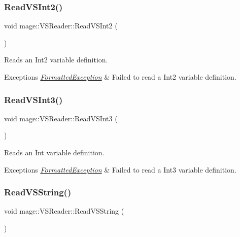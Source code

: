 \subsubsection{\texorpdfstring{Read\+V\+S\+Int2()}{ReadVSInt2()}}
{\footnotesize\ttfamily void mage\+::\+V\+S\+Reader\+::\+Read\+V\+S\+Int2 (\begin{DoxyParamCaption}{ }\end{DoxyParamCaption})\hspace{0.3cm}{\ttfamily [private]}}

Reads an Int2 variable definition.


\begin{DoxyExceptions}{Exceptions}
{\em \hyperlink{structmage_1_1_formatted_exception}{Formatted\+Exception}} & Failed to read a Int2 variable definition. \\
\hline
\end{DoxyExceptions}
\hypertarget{classmage_1_1_v_s_reader_a6fa8fa2cbb66a9a1872bb84a0612a32d}{}\label{classmage_1_1_v_s_reader_a6fa8fa2cbb66a9a1872bb84a0612a32d} 
\subsubsection{\texorpdfstring{Read\+V\+S\+Int3()}{ReadVSInt3()}}
{\footnotesize\ttfamily void mage\+::\+V\+S\+Reader\+::\+Read\+V\+S\+Int3 (\begin{DoxyParamCaption}{ }\end{DoxyParamCaption})\hspace{0.3cm}{\ttfamily [private]}}

Reads an Int variable definition.


\begin{DoxyExceptions}{Exceptions}
{\em \hyperlink{structmage_1_1_formatted_exception}{Formatted\+Exception}} & Failed to read a Int3 variable definition. \\
\hline
\end{DoxyExceptions}
\hypertarget{classmage_1_1_v_s_reader_a8d00057f90b2a2ed2e84e47530f91227}{}\label{classmage_1_1_v_s_reader_a8d00057f90b2a2ed2e84e47530f91227} 
\subsubsection{\texorpdfstring{Read\+V\+S\+String()}{ReadVSString()}}
{\footnotesize\ttfamily void mage\+::\+V\+S\+Reader\+::\+Read\+V\+S\+String (\begin{DoxyParamCaption}{ }\end{DoxyParamCaption})\hspace{0.3cm}{\ttfamily [private]}}

